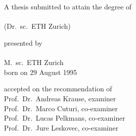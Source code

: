 \begin{titlepage}

    \begin{center}
        \large
        \begingroup
        \endgroup

        \hfill

        \vfill

        \begingroup
            \spacedallcaps{\myTitle}\\
            \vspace{5pt}\spacedallcaps{\footnotesize \mySubtitle}\\
        \endgroup

        \vfill

        \begingroup
            A thesis submitted to attain the degree of\\
            \vspace{0.5em}
             \\
            (Dr.\ sc.\ ETH Zurich)
        \endgroup

        \vfill

        \begingroup
            presented by\\
            \vspace{0.5em}
            \spacedallcaps{\normalsize \myName} \\
            M.\ sc.\ ETH Zurich \\
            \vspace{0.5em}
            born on 29 August 1995 \\
        \endgroup

        \vfill

        \begingroup
            accepted on the recommendation of\\
            \vspace{0.5em}
            Prof.\ Dr.\ Andreas Krause, examiner \\
            Prof.\ Dr.\ Marco Cuturi, co-examiner \\
            Prof.\ Dr.\ Lucas Pelkmans, co-examiner \\
            Prof.\ Dr.\ Jure Leskovec, co-examiner \\
        \endgroup

        \vfill

        \myTime%

        \vfill
    \end{center}

\end{titlepage}
